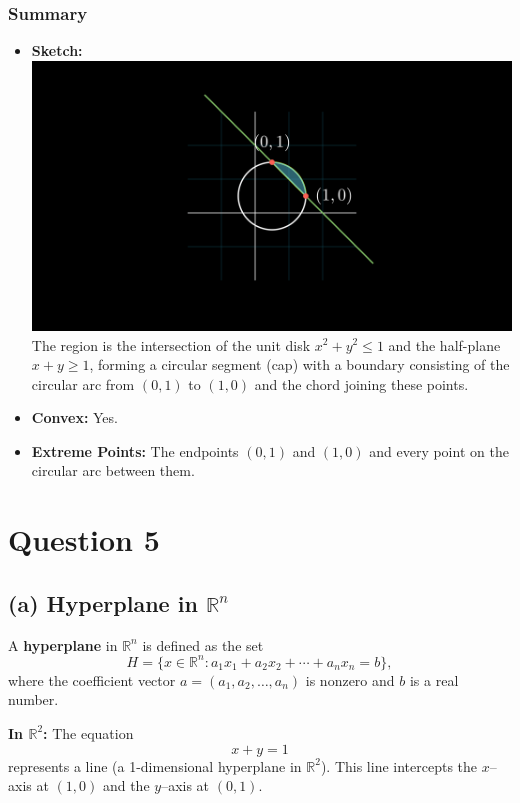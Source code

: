 \documentclass{article}
\begin{document}
\subsubsection*{Summary}
\begin{itemize}
    \item \textbf{Sketch:}\\[0.5em]
    \includegraphics[width=0.8\linewidth]{SystemCScene.png}\\[0.5em]
    The region is the intersection of the unit disk \(x^2+y^2\le1\) and the half-plane \(x+y\ge1\), forming a circular segment (cap) with a boundary consisting of the circular arc from \((0,1)\) to \((1,0)\) and the chord joining these points.
    \item \textbf{Convex:} Yes.
    \item \textbf{Extreme Points:} The endpoints \((0,1)\) and \((1,0)\) and every point on the circular arc between them.
\end{itemize}


\section*{Question 5}

\subsection*{(a) Hyperplane in $\mathbb{R}^n$}

A \textbf{hyperplane} in $\mathbb{R}^n$ is defined as the set
\[
H = \{ x \in \mathbb{R}^n : a_1 x_1 + a_2 x_2 + \cdots + a_n x_n = b \},
\]
where the coefficient vector $a = (a_1, a_2, \dots, a_n)$ is nonzero and $b$ is a real number.

\medskip
\textbf{In $\mathbb{R}^2$:} The equation 
\[
x + y = 1
\]
represents a line (a 1-dimensional hyperplane in $\mathbb{R}^2$). This line intercepts the $x$–axis at $(1,0)$ and the $y$–axis at $(0,1)$.
\end{document}
